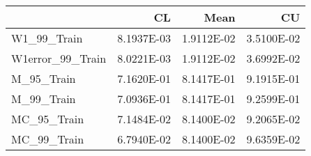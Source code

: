 \begin{tabular}{lrrr}
\toprule
{} &         CL &       Mean &         CU \\
\midrule
W1\_99\_Train      & 8.1937E-03 & 1.9112E-02 & 3.5100E-02 \\
W1error\_99\_Train & 8.0221E-03 & 1.9112E-02 & 3.6992E-02 \\
M\_95\_Train       & 7.1620E-01 & 8.1417E-01 & 9.1915E-01 \\
M\_99\_Train       & 7.0936E-01 & 8.1417E-01 & 9.2599E-01 \\
MC\_95\_Train      & 7.1484E-02 & 8.1400E-02 & 9.2065E-02 \\
MC\_99\_Train      & 6.7940E-02 & 8.1400E-02 & 9.6359E-02 \\
\bottomrule
\end{tabular}
